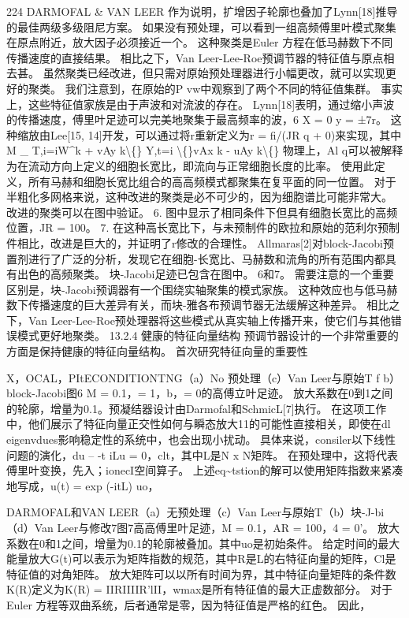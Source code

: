 \documentclass[UTF8,11pt,a4paper,openany,fontset=fandol]{ctexbook}
\begin{document}
224 DARMOFAL \& VAN LEER 作为说明，扩增因子轮廓也叠加了Lynn[18]推导的最佳两级多级阻尼方案。 如果没有预处理，可以看到一组高频傅里叶模式聚集在原点附近，放大因子必须接近一个。 这种聚类是Euler 方程在低马赫数下不同传播速度的直接结果。 相比之下，Van Leer-Lee-Roe预调节器的特征值与原点相去甚。 虽然聚类已经改进，但只需对原始预处理器进行小幅更改，就可以实现更好的聚类。 我们注意到，在原始的P vw中观察到了两个不同的特征值集群。 事实上，这些特征值家族是由于声波和对流波的存在。 Lynn[18]表明，通过缩小声波的传播速度，傅里叶足迹可以完美地聚集于最高频率的波，6 X = 0 y = ±7r。 这种缩放由Lee[15, 14]开发，可以通过将r重新定义为r = fi/(JR q + 0)来实现，其中M \_ T,i=iW\textasciicircum{}k + vAy k\textbackslash\{\} Y,t=i \textbackslash\{\}vAx k - uAy k\textbackslash\{\} 物理上，Al q可以被解释为在流动方向上定义的细胞长宽比，即流向与正常细胞长度的比率。 使用此定义，所有马赫和细胞长宽比组合的高高频模式都聚集在复平面的同一位置。 对于半粗化多网格来说，这种改进的聚类是必不可少的，因为细胞谱比可能非常大。 改进的聚类可以在图中验证。 6. 图中显示了相同条件下但具有细胞长宽比的高频位置，JR = 100。 7. 在这种高长宽比下，与未预制件的欧拉和原始的范利尔预制件相比，改进是巨大的，并证明了r修改的合理性。 Allmaras[2]对block-Jacobi预置剂进行了广泛的分析，发现它在细胞-长宽比、马赫数和流角的所有范围内都具有出色的高频聚类。 块-Jacobi足迹已包含在图中。 6和7。 需要注意的一个重要区别是，块-Jacobi预调器有一个围绕实轴聚集的模式家族。 这种效应也与低马赫数下传播速度的巨大差异有关，而块-雅各布预调节器无法缓解这种差异。 相比之下，Van Leer-Lee-Roe预处理器将这些模式从真实轴上传播开来，使它们与其他错误模式更好地聚类。 13.2.4 健康的特征向量结构 预调节器设计的一个非常重要的方面是保持健康的特征向量结构。 首次研究特征向量的重要性

X，OCAL，PItECONDITIONTNG（a）No 预处理（c）Van Leer与原始T f b）block-Jacobi图6 M = 0.1，= 1，b，= 0的高傅立叶足迹。 放大系数在0到1之间的轮廓，增量为0.1。预凝结器设计由Darmofal和SchmicL[7]执行。 在这项工作中，他们展示了特征向量正交性如何与瞬态放大11的可能性直接相关，即使在dl eigenvdues影响稳定性的系统中，也会出现小扰动。 具体来说，consiler以下线性问题的演化，du -- -t iLu = 0，clt，其中L是N x N矩阵。 在预处理中，这将代表傅里叶变换，先入；ionecI空间算子。 上述eq\textasciitilde{}tstion的解可以使用矩阵指数来紧凑地写成，u(t) = exp (-itL) uo，

DARMOFAL和VAN LEER（a）无预处理（c）Van Leer与原始T（b）块-J-bi（d）Van Leer与修改7图7高高傅里叶足迹，M = 0.1，AR = 100，4 = 0'。 放大系数在0和1之间，增量为0.1的轮廓被叠加。其中uo是初始条件。 给定时间的最大能量放大G(t)可以表示为矩阵指数的规范，其中R是L的右特征向量的矩阵，Cl是特征值的对角矩阵。 放大矩阵可以以所有时间为界，其中特征向量矩阵的条件数K(R)定义为K(R) = IIRIIIIR'lII，wmax是所有特征值的最大正虚数部分。 对于Euler 方程等双曲系统，后者通常是零，因为特征值是严格的红色。 因此，
\end{document}

